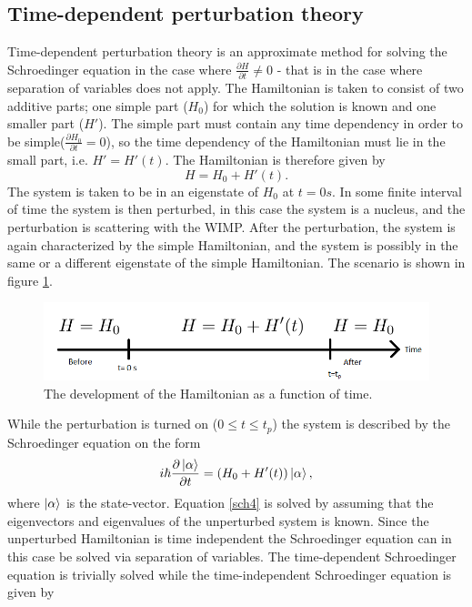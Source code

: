 \subsection*{Time-dependent perturbation theory}
Time-dependent perturbation theory is an approximate method for solving the Schroedinger equation in the case where $\frac{\partial H}{\partial t}\neq0$ - that is in the case where separation of variables does not apply. The Hamiltonian is taken to consist of two additive parts; one simple part ($H_0$) for which the solution is known and one smaller part ($H'$). The simple part must contain any time dependency in order to be simple($\frac{\partial H_0}{\partial t}=0$), so the time dependency of the Hamiltonian must lie in the small part, i.e. $H'=H'(t)$. The Hamiltonian is therefore given by
\begin{equation}
	H=H_0+H'(t).
\end{equation} 
The system is taken to be in an eigenstate of $H_0$ at $t=0s$. In some finite interval of time the system is then perturbed, in this case the system is a nucleus, and the perturbation is scattering with the WIMP. After the perturbation, the system is again characterized by the simple Hamiltonian, and the system is possibly in the same or a different eigenstate of the simple Hamiltonian. The scenario is shown in figure \ref{fig:jj}.
\begin{figure}[ht]
	\captionsetup{width=1\textwidth}
	\centering
	\includegraphics[width=1\textwidth]{figures/tipertub}
	\caption{The development of the Hamiltonian as a function of time.}
	\label{fig:jj}
\end{figure}
While the perturbation is turned on ($0\leq t\leq t_p$) the system is described by the Schroedinger equation on the form
\begin{equation}
	i\hbar\frac{\partial \ket{\alpha}}{\partial t}=(H_0+H'(t))\ket{\alpha},
	\label{sch4}
\end{equation} 
where $\ket{\alpha}$ is the state-vector. Equation \eqref{sch4} is solved by assuming that the eigenvectors and eigenvalues of the unperturbed system is known. Since the unperturbed Hamiltonian is time independent the Schroedinger equation can in this case be solved via separation of variables. The time-dependent Schroedinger equation is trivially solved while the time-independent Schroedinger equation is given by
